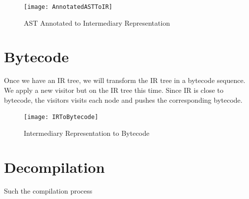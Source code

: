 \documentclass[a4paper,10pt,twoside]{book}
\begin{document}
 
\begin{figure}[ht]\centering
	\texttt{[image: AnnotatedASTToIR]}
	\caption{AST Annotated to Intermediary Representation  }
\end{figure}




\section{Bytecode}
Once we have an IR tree, we will transform the IR tree in a bytecode sequence. We apply a new visitor but on the IR tree this time. Since IR is close to bytecode, the visitors visits each node and pushes the corresponding bytecode.

\begin{figure}[ht]\centering
	\texttt{[image: IRToBytecode]}
	\caption{Intermediary Representation to Bytecode }
\end{figure}


\section{Decompilation}
Such the compilation process

\ifx\wholebook\relax\else
   
   
\end{document}
